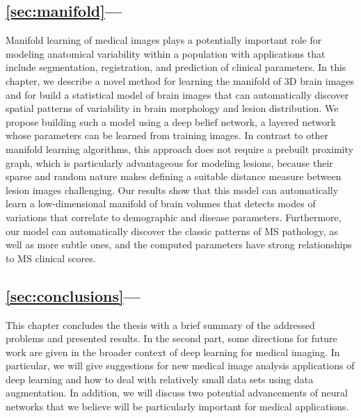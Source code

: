 \subsection*{\ref{sec:manifold}---}

Manifold learning of medical images plays a potentially important role for
modeling anatomical variability within a population with applications that
include segmentation, registration, and prediction of clinical parameters.
In this chapter, we describe a novel method for learning the manifold of 3D
brain images and for build a statistical model of brain images that can
automatically discover spatial patterns of variability in brain morphology and
lesion distribution. We propose building such a model using a deep belief
network, a layered network whose parameters can be learned from training
images. In contrast to other manifold learning algorithms, this approach does
not require a prebuilt proximity graph, which is particularly advantageous for
modeling lesions, because their sparse and random nature makes defining a
suitable distance measure between lesion images challenging. Our results show
that this model can automatically learn a low-dimensional manifold of brain
volumes that detects modes of variations that correlate to demographic and
disease parameters. Furthermore, our model can automatically discover the
classic patterns of MS pathology, as well as more subtle ones, and the
computed parameters have strong relationships to MS clinical scores.

\subsection*{\ref{sec:conclusions}---}

This chapter concludes the thesis with a brief summary of the addressed problems
and presented results. In the second part, some directions for future work are
given in the broader context of deep learning for medical imaging. In
particular, we will give suggestions for new medical image analysis applications
of deep learning and how to deal with relatively small data sets using data
augmentation. In addition, we will discuss two potential advancements of neural
networks that we believe will be particularly important for medical
applications.


